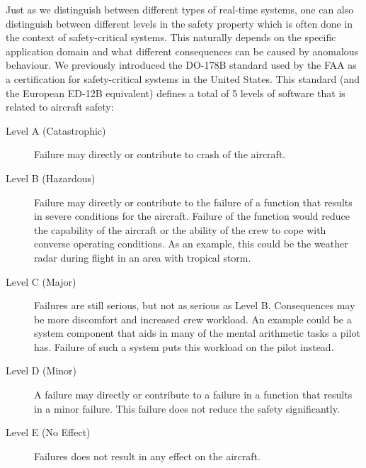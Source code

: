 Just as we distinguish between different types of real-time systems, one can also distinguish between different levels in the safety property which is often done in the context of safety-critical systems. This naturally depends on the specific application domain and what different consequences can be caused by anomalous behaviour. We previously introduced the DO-178B standard used by the FAA as a certification for safety-critical systems in the United States. This standard (and the European ED-12B equivalent) defines a total of 5 levels of software that is related to aircraft safety:
\begin{description}
	\item[Level A (Catastrophic)] Failure may directly or contribute to crash of the aircraft.  
	\item[Level B (Hazardous)] Failure may directly or contribute to the failure of a function that results in severe conditions for the aircraft. Failure of the function would reduce the capability of the aircraft or the ability of the crew to cope with converse operating conditions. As an example, this could be the weather radar during flight in an area with tropical storm.
	\item[Level C (Major)] Failures are still serious, but not as serious as Level B. Consequences may be more discomfort and increased crew workload. An example could be a system component that aids in many of the mental arithmetic tasks a pilot has. Failure of such a system puts this workload on the pilot instead.
	\item[Level D (Minor)] A failure may directly or contribute to a failure in a function that results in a minor failure. This failure does not reduce the safety significantly.
	\item[Level E (No Effect)] Failures does not result in any effect on the aircraft.
\end{description}


